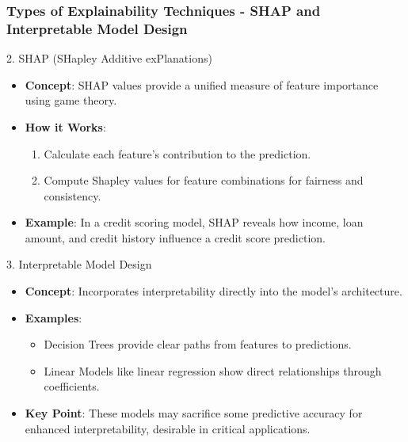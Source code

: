 \documentclass[aspectratio=169]{beamer}
\begin{document}
\begin{frame}[fragile]
  \frametitle{Types of Explainability Techniques - SHAP and Interpretable Model Design}
  \begin{block}{2. SHAP (SHapley Additive exPlanations)}
    \begin{itemize}
      \item \textbf{Concept}: SHAP values provide a unified measure of feature importance using game theory.
      \item \textbf{How it Works}:
        \begin{enumerate}
          \item Calculate each feature's contribution to the prediction.
          \item Compute Shapley values for feature combinations for fairness and consistency.
        \end{enumerate}
      \item \textbf{Example}: In a credit scoring model, SHAP reveals how income, loan amount, and credit history influence a credit score prediction.
    \end{itemize}
  \end{block}
  
  \begin{block}{3. Interpretable Model Design}
    \begin{itemize}
      \item \textbf{Concept}: Incorporates interpretability directly into the model’s architecture.
      \item \textbf{Examples}:
        \begin{itemize}
          \item Decision Trees provide clear paths from features to predictions.
          \item Linear Models like linear regression show direct relationships through coefficients.
        \end{itemize}
      \item \textbf{Key Point}: These models may sacrifice some predictive accuracy for enhanced interpretability, desirable in critical applications.
    \end{itemize}
  \end{block}
\end{frame}
\end{document}
